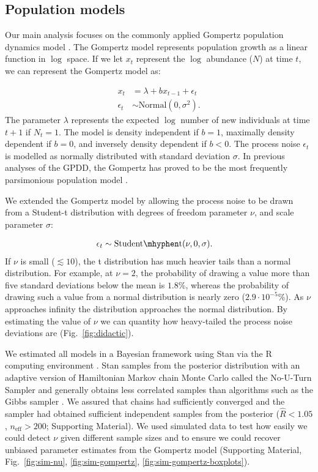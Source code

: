 \subsection{Population models}

Our main analysis focuses on the commonly applied Gompertz population dynamics
model \citep[e.g.][]{knape2012,dennis2014,connors2014}. The Gompertz model
represents population growth as a linear function in $\log$ space. If we let
$x_t$ represent the $\log$ abundance ($N$) at time $t$, we can represent the
Gompertz model as:

\vspace{-6mm}
\begin{align*}
x_t &= \lambda + b x_{t-1} + \epsilon_t\\
\epsilon_t &\sim \mathrm{Normal}(0, \sigma^2).
\end{align*}
The parameter $\lambda$ represents the expected $\log$ number of new
individuals at time $t + 1$ if $N_t = 1$. The model is density independent if
$b = 1$, maximally density dependent if $b = 0$, and inversely density
dependent if $b < 0$. The process noise $\epsilon_t$ is modelled as normally
distributed with standard deviation $\sigma$. In previous analyses of the GPDD,
the Gompertz has proved to be the most frequently parsimonious population model
\citep{brook2006}.

We extended the Gompertz model by allowing the process noise to be
drawn from a Student-t distribution with degrees of freedom parameter $\nu$,
and scale parameter $\sigma$:

\vspace{-6mm}
\begin{align*}
\epsilon_t &\sim \mathrm{Student\mhyphen t}(\nu, 0, \sigma).
\end{align*}
If $\nu$ is small ($\lesssim 10$), the t distribution has much heavier tails
than a normal distribution. For example, at $\nu = 2$, the probability of
drawing a value more than five standard deviations below the mean is $1.8$\%,
whereas the probability of drawing such a value from a normal distribution is
nearly zero ($2.9\cdot10^{-5}$\%). As $\nu$ approaches infinity the
distribution approaches the normal distribution. By estimating the value of
$\nu$ we can quantity how heavy-tailed the process noise deviations are
(Fig.~\ref{fig:didactic}).

We estimated all models in a Bayesian framework using Stan \citep[][version
2.4.0]{stan-manual2014} via the R computing environment \citep{r2014}. Stan
samples from the posterior distribution with an adaptive version of Hamiltonian
Markov chain Monte Carlo called the No-U-Turn Sampler and generally obtains
less correlated samples than algorithms such as the Gibbs sampler
\citep{hoffman2014}. We assured that chains had sufficiently converged and the
sampler had obtained sufficient independent samples from the posterior
($\widehat{R} < 1.05$, $n_\mathrm{eff} > 200$; Supporting Material). We used
simulated data to test how easily we could detect $\nu$ given different sample
sizes and to ensure we could recover unbiased parameter estimates from the
Gompertz model (Supporting Material, Fig.~\ref{fig:sim-nu},
\ref{fig:sim-gompertz}, \ref{fig:sim-gompertz-boxplots}).


